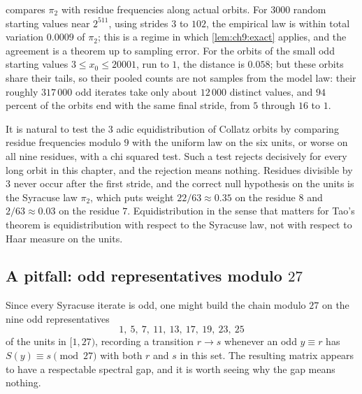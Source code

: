  compares $\pi_2$ with residue frequencies along actual
orbits. For $3000$ random starting values near $2^{511}$, using strides $3$ to
$102$, the empirical law is within total variation $0.0009$ of $\pi_2$; this is
a regime in which \cref{lem:ch9:exact} applies, and the agreement is a theorem
up to sampling error. For the orbits of the small odd starting values
$3\le x_0\le20001$, run to $1$, the distance is $0.058$; but these orbits share
their tails, so their pooled counts are not samples from the model law: their
roughly $317\,000$ odd iterates take only about $12\,000$ distinct values, and
$94$ percent of the orbits end with the same final stride, from $5$ through $16$ to $1$.

\begin{remark}\label{rem:ch9:null}
It is natural to test the $3$ adic equidistribution of Collatz orbits by
comparing residue frequencies modulo $9$ with the uniform law on the six units,
or worse on all nine residues, with a chi squared test.
Such a test rejects decisively for every long orbit in this chapter, and the rejection means nothing.
Residues divisible by $3$ never occur after the first stride, and the correct
null hypothesis on the units is the Syracuse law $\pi_2$, which puts weight
$22/63\approx0.35$ on the residue $8$ and $2/63\approx0.03$ on the residue $7$.
Equidistribution in the sense that matters for Tao's theorem is
equidistribution with respect to the Syracuse law, not with respect to Haar
measure on the units.
\end{remark}

\subsection{A pitfall: odd representatives modulo $27$}

Since every Syracuse iterate is odd, one might build the chain modulo $27$ on the nine odd representatives
\[
  1,\ 5,\ 7,\ 11,\ 13,\ 17,\ 19,\ 23,\ 25
\]
of the units in $[1,27)$, recording a transition $r\to s$ whenever an odd $y\equiv r$ has
$S(y)\equiv s\pmod{27}$ with both $r$ and $s$ in this set. The resulting matrix appears to have a respectable spectral gap, and it is worth seeing why the gap means nothing.

